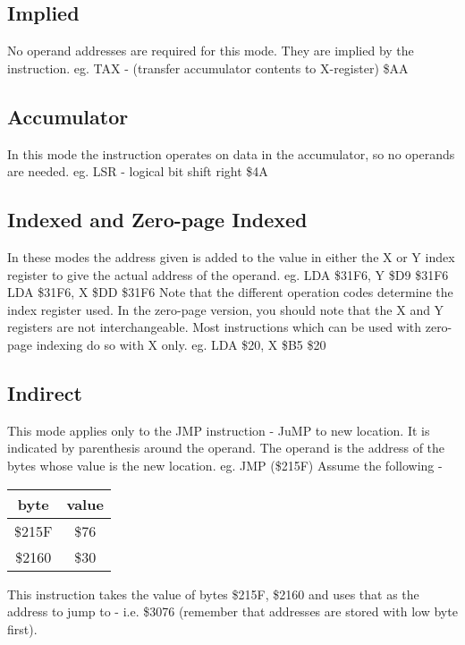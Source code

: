 \documentclass{article}
\begin{document}
  \subsection{Implied}
  No operand addresses are required for this mode. They are implied by the
  instruction.
  eg.  TAX - (transfer accumulator contents to X-register)
       \$AA

  \subsection{Accumulator}
  In this mode the instruction operates on data in the accumulator, so no
  operands are needed.
  eg.  LSR - logical bit shift right
       \$4A

  \subsection{Indexed and Zero-page Indexed}
  In these modes the address given is added to the value in either the X or
  Y index register to give the actual address of the operand.
  eg.  LDA \$31F6, Y
       \$D9 \$31F6
       LDA \$31F6, X
       \$DD \$31F6
  Note that the different operation codes determine the index register used.
  In the zero-page version, you should note that the X and Y registers are
  not interchangeable. Most instructions which can be used with zero-page
  indexing do so with X only.
  eg.  LDA \$20, X
       \$B5 \$20

  \subsection{Indirect}
  This mode applies only to the JMP instruction - JuMP to new location. It is
  indicated by parenthesis around the operand. The operand is the address of
  the bytes whose value is the new location.
  eg.  JMP (\$215F)
  Assume the following -

  \begin{table}[h!]
  \centering
  \begin{tabular}{|c c|}
  \hline        
  byte   &  value \\
  \hline
  \$215F  &  \$76 \\
  \$2160  &  \$30 \\
  \hline
  \end{tabular}
  \end{table}

  This instruction takes the value of bytes \$215F, \$2160 and uses that as the
  address to jump to - i.e. \$3076 (remember that addresses are stored with
  low byte first).
\end{document}
